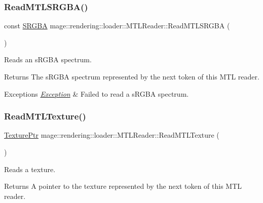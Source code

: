 \subsubsection{\texorpdfstring{Read\+M\+T\+L\+S\+R\+G\+B\+A()}{ReadMTLSRGBA()}}
{\footnotesize\ttfamily const \mbox{\hyperlink{structmage_1_1_s_r_g_b_a}{S\+R\+G\+BA}} mage\+::rendering\+::loader\+::\+M\+T\+L\+Reader\+::\+Read\+M\+T\+L\+S\+R\+G\+BA (\begin{DoxyParamCaption}{ }\end{DoxyParamCaption})\hspace{0.3cm}{\ttfamily [private]}}

Reads an s\+R\+G\+BA spectrum.

\begin{DoxyReturn}{Returns}
The s\+R\+G\+BA spectrum represented by the next token of this M\+TL reader. 
\end{DoxyReturn}

\begin{DoxyExceptions}{Exceptions}
{\em \mbox{\hyperlink{classmage_1_1_exception}{Exception}}} & Failed to read a s\+R\+G\+BA spectrum. \\
\hline
\end{DoxyExceptions}
\mbox{\label{classmage_1_1rendering_1_1loader_1_1_m_t_l_reader_abf1609fbd22075fa4e692b7b6eab06fd}} 
\subsubsection{\texorpdfstring{Read\+M\+T\+L\+Texture()}{ReadMTLTexture()}}
{\footnotesize\ttfamily \mbox{\hyperlink{namespacemage_1_1rendering_a6f3ae54f825328465b0cdde0f0de4a36}{Texture\+Ptr}} mage\+::rendering\+::loader\+::\+M\+T\+L\+Reader\+::\+Read\+M\+T\+L\+Texture (\begin{DoxyParamCaption}{ }\end{DoxyParamCaption})\hspace{0.3cm}{\ttfamily [private]}}

Reads a texture.

\begin{DoxyReturn}{Returns}
A pointer to the texture represented by the next token of this M\+TL reader. 
\end{DoxyReturn}

